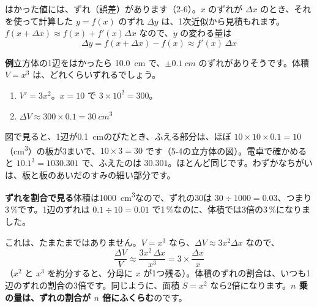 \label{bk:5-8:gosa}はかった値には、ずれ（誤差）があります（2-6）。$x$ のずれが $\Delta x$ のとき、それを使って計算した $y=f(x)$ のずれ $\Delta y$ は、1次近似から見積もれます。$f(x+\Delta x)\approx f(x)+f'(x)\Delta x$ なので、$y$ の変わる量は
\[ \Delta y=f(x+\Delta x)-f(x)\approx f'(x)\,\Delta x \]

\noindent\textbf{例}\quad 立方体の1辺をはかったら \qty{10.0}{cm} で、$\pm\qty{0.1}{cm}$ のずれがありそうです。体積 $V=x^3$ は、どれくらいずれるでしょう。
\begin{enumerate}[leftmargin=2.6\zw, itemsep=1pt, topsep=2pt]
\item $V'=3x^2$。$x=10$ で $3\times10^2=300$。
\item $\Delta V\approx300\times0.1=\qty{30}{cm^3}$
\end{enumerate}

\noindent\begin{minipage}[c]{0.5\linewidth}\raggedright
図で見ると、1辺が\qty{0.1}{cm}のびたとき、ふえる部分は、ほぼ $10\times10\times0.1=10$（\unit{cm^3}）の板が3まいで、$10\times3=30$ です（5-4の立方体の図）。電卓で確かめると $10.1^3=1030.301$ で、ふえたのは $30.301$。ほとんど同じです。わずかなちがいは、板と板のあいだのすみの細い部分です。
\end{minipage}\hfill
\begin{minipage}[c]{0.46\linewidth}\centering
{}
\end{minipage}

\medskip
\noindent\textbf{ずれを割合で見る}\quad 体積は\qty{1000}{cm^3}なので、ずれの30は $30\div1000=0.03$、つまり3\,\%です。1辺のずれは $0.1\div10=0.01$ で1\,\%なのに、体積では3倍の3\,\%になりました。

これは、たまたまではありません。$V=x^3$ なら、$\Delta V\approx3x^2\Delta x$ なので、
\[ \frac{\Delta V}{V}\approx\frac{3x^2\,\Delta x}{x^3}=3\times\frac{\Delta x}{x} \]
（$x^2$ と $x^3$ を約分すると、分母に $x$ が1つ残る）。体積のずれの割合は、いつも1辺のずれの割合の3倍です。同じように、面積 $S=x^2$ なら2倍になります。\textbf{$n$ 乗の量は、ずれの割合が $n$ 倍にふくらむ}のです。

